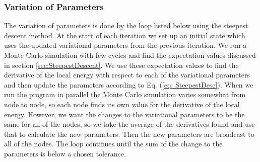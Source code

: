 \documentclass[../main.tex]{subfiles}
\begin{document}
\subsubsection{Variation of Parameters}

The variation of parameters is done by the loop listed below using the steepest descent method. At the start of each iteration we set up an initial state which uses the updated variational parameters from the previous iteration. We run a Monte Carlo simulation with few cycles and find the expectation values discussed in section \ref{sec:SteepestDescent}. We use these expectation values to find the derivative of the local energy with respect to each of the variational parameters and then update the parameters according to Eq. (\ref{eq: SteepestDesc}). When we run the program in parallel the Monte Carlo simulation varies somewhat from node to node, so each node finds its own value for the derivative of the local energy. However, we want the changes to the variational parameters to be the same for all of the nodes, so we take the average of the derivatives found and use that to calculate the new parameters. Then the new parameters are broadcast to all of the nodes. The loop continues until the sum of the change to the parameters is below a chosen tolerance.
\end{document}
